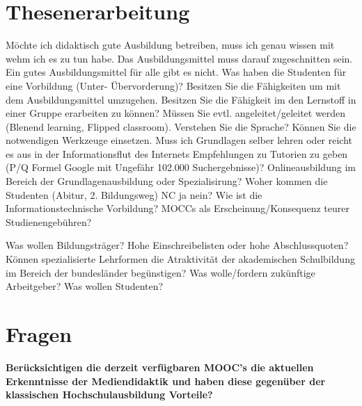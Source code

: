 \documentclass[150]{HSMW-Thesis}
\begin{document}


\begin{Referat}
\end{Referat}

\begin{Vorwort}
\end{Vorwort}

\Hauptteil
\printnomenclature


\chapter{Thesenerarbeitung}
Möchte ich didaktisch gute Ausbildung betreiben, muss ich genau wissen mit wehm ich es zu tun habe. Das Ausbildungsmittel muss darauf zugeschnitten sein. 
Ein gutes Ausbildungsmittel für alle gibt es nicht. Was haben die Studenten für eine Vorbildung (Unter- Übervorderung)? 
Besitzen Sie die Fähigkeiten um mit dem Ausbildungsmittel umzugehen. Besitzen Sie die Fähigkeit im den Lernstoff in einer Gruppe erarbeiten zu können?
Müssen Sie evtl. angeleitet/geleitet werden (Blenend learning, Flipped classroom). Verstehen Sie die Sprache? Können Sie die notwendigen Werkzeuge einsetzen.
Muss ich Grundlagen selber lehren oder reicht es aus in der Informationsflut des Internets Empfehlungen zu Tutorien zu geben (P/Q Formel Google mit Ungefähr 102.000 Suchergebnisse)?
Onlineausbildung im Bereich der Grundlagenausbildung oder Spezialisirung? Woher kommen die Studenten (Abitur, 2. Bildungsweg) NC ja nein? Wie ist die Informationstechnische Vorbildung? 
MOCCs als Erscheinung/Konsequenz teurer Studienengebühren? 

Was wollen Bildungsträger? Hohe Einschreibelisten oder hohe Abschlussquoten? Können spezialisierte Lehrformen die Atraktivität der akademischen Schulbildung im Bereich der bundesländer begünstigen? 
Was wolle/fordern zukünftige Arbeitgeber? Was wollen Studenten?



\chapter{Fragen}
\textbf{Berücksichtigen die derzeit verfügbaren MOOC's die aktuellen Erkenntnisse der Mediendidaktik und haben diese gegenüber der klassischen Hochschulausbildung Vorteile?}
\end{document}
